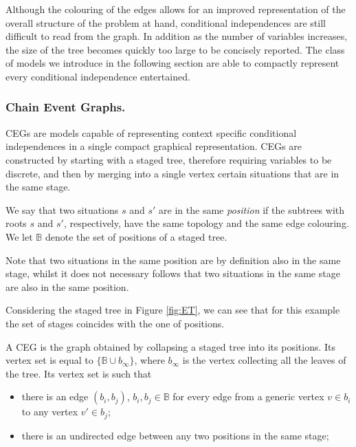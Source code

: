Although the colouring of the edges allows for an improved representation of the overall structure of the problem at hand, conditional independences are still difficult to read from the graph. In addition as the number of variables increases, the size of the tree becomes quickly too large to be concisely reported. The class of models we introduce in the following section are able to compactly represent every conditional independence entertained.

\subsubsection{Chain Event Graphs.}
\label{sec:CEG}

\glspl{CEG} \citep{Smith2008} are models capable of representing context specific conditional independences in a single compact graphical representation. \glspl{CEG} are constructed by starting with a staged tree, therefore requiring variables to be discrete, and then by merging into a single vertex certain situations that are in the same stage. 

\begin{definition}
We say that two situations $s$ and $s'$ are in the same \emph{position} if the subtrees with roots $s$ and ${s'}$, respectively, have the same topology and the same edge colouring. We let $\mathbb{B}$ denote the set of positions of a staged tree.
\end{definition}

Note that two situations in the same position are by definition also in the same stage, whilst it does not necessary follows that two situations in the same stage are also in the same position. 

\begin{example}
 Considering the staged tree in Figure \ref{fig:ET}, we can see that for this example the set of stages coincides with the one of positions. 
\end{example} 
 
 \begin{definition}
 A \gls{CEG} is the graph obtained by collapsing a staged tree into its positions. Its vertex set is equal to $\{\mathbb{B}\cup b_{\infty}\}$, where $b_{\infty}$ is the vertex collecting all the leaves of the tree. Its vertex set is such that 
 \begin{itemize}
 \item there is an edge $(b_i,b_j)$, $b_i,b_j\in\mathbb{B}$ for every edge from a generic vertex $v\in b_i$ to any vertex $v'\in b_j$;
 \item there is an undirected edge between any two positions in the same stage;
 \end{itemize}
 \end{definition} 
 
